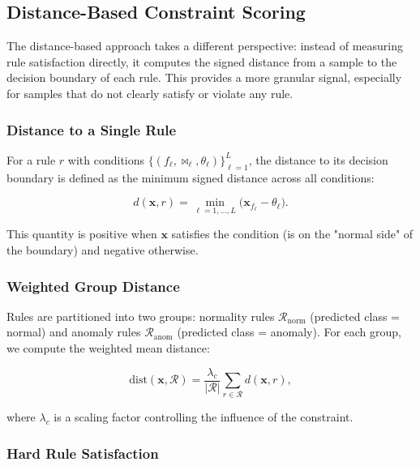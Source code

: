 \subsection{Distance-Based Constraint Scoring}
\label{sec:distance_scoring}

The distance-based approach takes a different perspective: instead of measuring rule satisfaction directly, it computes the signed distance from a sample to the decision boundary of each rule. This provides a more granular signal, especially for samples that do not clearly satisfy or violate any rule.

\subsubsection{Distance to a Single Rule}

For a rule $r$ with conditions $\{(f_\ell, \bowtie_\ell, \theta_\ell)\}_{\ell=1}^L$, the distance to its decision boundary is defined as the minimum signed distance across all conditions:

\begin{equation}
d(\mathbf{x}, r) = \min_{\ell=1,\dots,L} \bigl( \mathbf{x}_{f_\ell} - \theta_\ell \bigr).
\label{eq:distance_rule}
\end{equation}

This quantity is positive when $\mathbf{x}$ satisfies the condition (is on the "normal side" of the boundary) and negative otherwise.

\subsubsection{Weighted Group Distance}

Rules are partitioned into two groups: normality rules $\mathcal{R}_{\text{norm}}$ (predicted class = normal) and anomaly rules $\mathcal{R}_{\text{anom}}$ (predicted class = anomaly). For each group, we compute the weighted mean distance:

\begin{equation}
\text{dist}(\mathbf{x}, \mathcal{R}) = \frac{\lambda_c}{|\mathcal{R}|} \sum_{r \in \mathcal{R}} d(\mathbf{x}, r),
\label{eq:group_distance}
\end{equation}

where $\lambda_c$ is a scaling factor controlling the influence of the constraint.

\subsubsection{Hard Rule Satisfaction}


